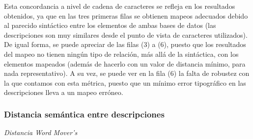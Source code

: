 Esta concordancia a nivel de cadena de caracteres se refleja en los resultados obtenidos, ya que en las tres primeras filas se obtienen mapeos adecuados debido al parecido sintáctico entre los elementos de ambas bases de datos (las descripciones son muy similares desde el punto de vista de caracteres utilizados). De igual forma, se puede apreciar de las filas (3) a (6), puesto que los resultados del mapeo no tienen ningún tipo de relación, más allá de la sintáctica, con los elementos mapeados (además de hacerlo con un valor de distancia mínimo, para nada representativo). A su vez, se puede ver en la fila (6) la falta de robustez con la que contamos con esta métrica, puesto que un mínimo error tipográfico en las descripciones lleva a un mapeo erróneo. 














\subsubsection{Distancia semántica entre descripciones}
\begin{flushleft}
    \textit{Distancia Word Mover's }
\end{flushleft}%

